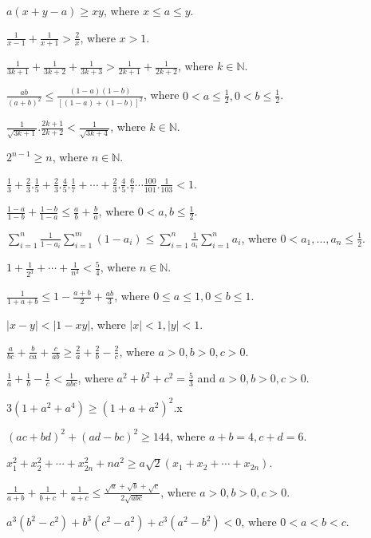 \item $a(x + y - a)\geq xy$, where $x\leq a\leq y$.
\item $\frac{1}{x - 1} + \frac{1}{x + 1} > \frac{2}{x}$, where $x > 1$.
\item $\frac{1}{3k + 1} + \frac{1}{3k + 2} + \frac{1}{3k + 3} > \frac{1}{2k + 1} + \frac{1}{2k + 2}$, where $k\in\mathbb{N}$.
\item $\frac{ab}{(a + b)^2}\leq \frac{(1 - a)(1 - b)}{[(1 - a) + (1 - b)]^2}$, where $0 < a\leq\frac{1}{2}, 0<b\leq\frac{1}{2}$.
\item $\frac{1}{\sqrt{3k + 1}}.\frac{2k + 1}{2k + 2} < \frac{1}{\sqrt{3k + 4}}$, where $k\in\mathbb{N}$.
\item $2^{n - 1}\geq n$, where $n\in\mathbb{N}$.
\item $\frac{1}{3} + \frac{2}{3}.\frac{1}{5} + \frac{2}{3}.\frac{4}{5}.\frac{1}{7} + \cdots +
  \frac{2}{3}.\frac{4}{5}.\frac{6}{7}\cdots \frac{100}{101}.\frac{1}{103} < 1$.
\item $\frac{1 - a}{1 - b} + \frac{1 - b}{1 - a}\leq \frac{a}{b} + \frac{b}{a}$, where $0 < a, b\leq \frac{1}{2}$.
\item $\displaystyle\sum_{i=1}^n\frac{1}{1 - a_i}\sum_{i=1}^m(1 - a_i)\leq \sum_{i=1}^n\frac{1}{a_i}\sum_{i=1}^na_i$, where $0 < a_1, \ldots,
  a_n\leq \frac{1}{2}$.
\item $1 + \frac{1}{2^3} + \cdots + \frac{1}{n^3} < \frac{5}{4}$, where $n\in\mathbb{N}$.
\item $\frac{1}{1 + a + b}\leq 1 - \frac{a + b}{2} + \frac{ab}{3}$, where $0\leq a\leq 1, 0\leq b\leq 1$.
\item $|x - y| < |1 - xy|$, where $|x| < 1, |y| < 1$.
\item $\frac{a}{bc} + \frac{b}{ca} + \frac{c}{ab}\geq \frac{2}{a} + \frac{2}{b} - \frac{2}{c}$, where $a > 0, b > 0, c > 0$.
\item $\frac{1}{a} + \frac{1}{b} - \frac{1}{c} < \frac{1}{abc}$, where $a^2 + b^2 + c^2 = \frac{5}{3}$ and $a > 0, b > 0, c > 0$.
\item $3(1 + a^2 + a^4)\geq (1 + a + a^2)^2$.x
\item $(ac + bd)^2 + (ad - bc)^2\geq 144$, where $a + b = 4, c + d = 6$.
\item $x_1^2 + x_2^2 + \cdots + x_{2n}^2 + na^2 \geq a\sqrt{2}(x_1 + x_2 + \cdots + x_{2n})$.
\item $\frac{1}{a + b} + \frac{1}{b + c} + \frac{1}{a + c}\leq \frac{\sqrt{a} + \sqrt{b} + \sqrt{c}}{2\sqrt{abc}}$, where $a > 0, b
  > 0, c > 0$.
\item $a^3(b^2 - c^2) + b^3(c^2 - a^2) + c^3(a^2 - b^2) < 0$, where $0 < a < b < c$.
